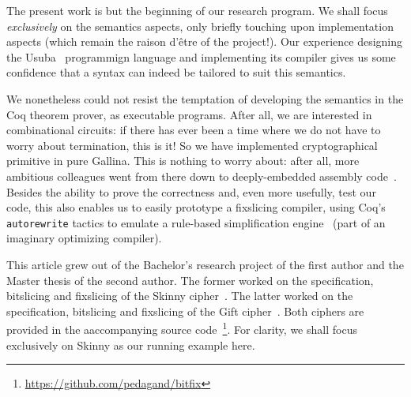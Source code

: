 \documentclass[draft,english]{jflart}
\begin{document}

The present work is but the beginning of our research program. We
shall focus \emph{exclusively} on the semantics aspects, only briefly
touching upon implementation aspects (which remain the raison d'être
of the project!). Our experience designing the Usuba~\citep{usuba}
programmign language and implementing its compiler gives us some
confidence that a syntax can indeed be tailored to suit this
semantics.

We nonetheless could not resist the temptation of developing the
semantics in the Coq theorem prover, as executable programs. After
all, we are interested in combinational circuits: if there has ever
been a time where we do not have to worry about termination, this is
it! So we have implemented cryptographical primitive in pure Gallina.
This is nothing to worry about: after all, more ambitious colleagues
went from there down to deeply-embedded assembly
code~\citep{chlipala}. Besides the ability to prove the correctness
and, even more usefully, test our code, this also enables us to easily
prototype a fixslicing compiler, using Coq's \texttt{autorewrite}
tactics to emulate a rule-based simplification
engine~\citep{haskell:simplier} (part of an imaginary optimizing
compiler).




This article grew out of the Bachelor's research project of the first
author and the Master thesis of the second author. The former worked
on the specification, bitslicing and fixslicing of the Skinny
cipher~\citep{skinny-spec, adomin:skinny}. The latter worked on the
specification, bitslicing and fixslicing of the Gift
cipher~\citep{gift-spec, admon:gift}. Both ciphers are provided in the
aaccompanying source code~\footnote{\url{https://github.com/pedagand/bitfix}}. For clarity, we shall
focus exclusively on Skinny as our running example here.
\end{document}
